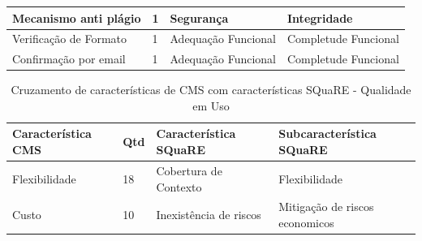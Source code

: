 \begin{apendicesenv}
\begin{longtable}{|p{175pt}|p{18pt}|p{110pt}|p{120pt}|}
  	 	\hline  
{\raggedright {Mecanismo anti plágio}}
  	 	 & {\raggedright {1}}
  	 	 & {\raggedright {Segurança}}
  	 	 & {\raggedright {Integridade}}\\
  	 	\hline
{\raggedright {Verificação de Formato}}
  	 	 & {\raggedright {1}}
  	 	 & {\raggedright {Adequação Funcional}}
  	 	 & {\raggedright {Completude Funcional}}\\
  	 	\hline  	 	
{\raggedright {Confirmação por email}}
  	 	 & {\raggedright {1}}
  	 	 & {\raggedright {Adequação Funcional}}
  	 	 & {\raggedright {Completude Funcional}}\\
  	 	\hline  	  	 	 	

	\end{longtable}

	\begin{longtable}{|p{175pt}|p{18pt}|p{110pt}|p{120pt}|}
 	\caption{Cruzamento de características de CMS com características SQuaRE - Qualidade em Uso} 
 	\label{mapeamento_Square_uso}\\
 	\hline
 	 {\raggedright \textbf{Característica CMS}}
 	 & {\raggedright \textbf{Qtd}}
 	 & {\raggedright \textbf{Característica SQuaRE}}
 	  	 & {\raggedright \textbf{Subcaracterística SQuaRE}}\\
 	\hline
 	{\raggedright {Flexibilidade}}
 	  	 	 & {\raggedright {18}}
 	  	 	 & {\raggedright {Cobertura de Contexto}}
 	  	 	 & {\raggedright {Flexibilidade}}\\
 	  	 	\hline
 	{\raggedright {Custo}}
 	  	 	 & {\raggedright {10}}
 	  	 	 & {\raggedright {Inexistência de riscos}}
 	  	 	 & {\raggedright {Mitigação de riscos economicos}}\\
 	  	 	\hline
 	
 	\end{longtable}


\end{apendicesenv}

